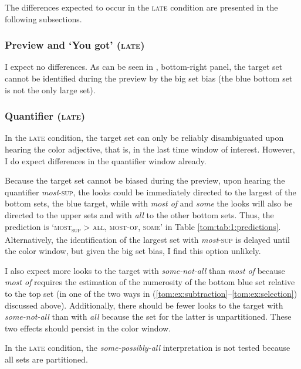\documentclass[output=paper]{langscibook}
\begin{document}

The differences expected to occur in the \textsc{late} condition are presented in the following subsections.

\subsubsection{Preview and `You got' (\textsc{late})}

I expect no differences. As can be seen in , bottom-right panel, the target set cannot be identified during the
preview by the big set bias (the blue bottom set is not the only large set).
\bigskip

\subsubsection{Quantifier (\textsc{late})}

In the \textsc{late} condition, the target set can only be reliably disambiguated upon hearing the color adjective, that is, in
the last time window of interest. However, I do expect differences in the quantifier window already.

Because the target set cannot be biased during the preview, upon hearing the quantifier \textit{most}\textsc{-sup}, the
looks could be immediately directed to the largest of the bottom sets, the blue target, while with \textit{most of} and
\textit{some} the looks will also be directed to the upper sets and with \textit{all} to the other bottom sets. Thus,
the prediction is `\textsc{most\textsubscript{sup}} {\textgreater} \textsc{all}, \textsc{most-of}, \textsc{some}' in
Table \ref{tom:tab:1:predictions}. Alternatively, the identification of the largest set with \textit{most}\textsc{-sup} is delayed until the
color window, but given the big set bias, I find this option unlikely.

I also expect more looks to the target with \textit{some-not-all} than \textit{most of} because \textit{most of}
requires the estimation of the numerosity of the bottom blue set relative to the top set (in one of the two ways in (\ref{tom:ex:subtraction}--\ref{tom:ex:selection}) discussed above). Additionally, there should be fewer looks to the target with \textit{some-not-all} than with
\textit{all} because the set for the latter is unpartitioned. These two effects should persist in the color window.

In the \textsc{late} condition, the \textit{some-possibly-all} interpretation is not tested because all sets are partitioned.
\end{document}

